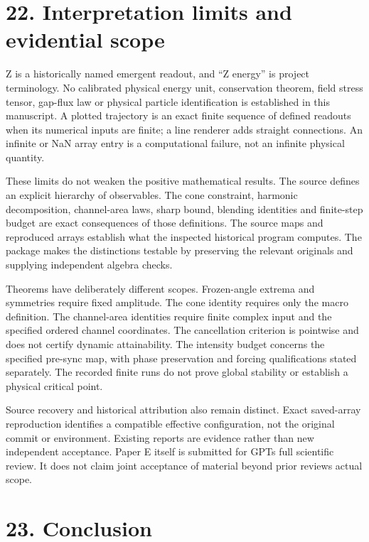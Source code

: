 \documentclass[
  11pt,
  a4paper,
]{article}
\begin{document}
\section{22. Interpretation limits and evidential scope}\label{interpretation-limits-and-evidential-scope}

Z is a historically named emergent readout, and ``Z energy'' is project terminology. No calibrated physical energy unit, conservation theorem, field stress tensor, gap-flux law or physical particle identification is established in this manuscript. A plotted trajectory is an exact finite sequence of defined readouts when its numerical inputs are finite; a line renderer adds straight connections. An infinite or NaN array entry is a computational failure, not an infinite physical quantity.

These limits do not weaken the positive mathematical results. The source defines an explicit hierarchy of observables. The cone constraint, harmonic decomposition, channel-area laws, sharp bound, blending identities and finite-step budget are exact consequences of those definitions. The source maps and reproduced arrays establish what the inspected historical program computes. The package makes the distinctions testable by preserving the relevant originals and supplying independent algebra checks.

Theorems have deliberately different scopes. Frozen-angle extrema and symmetries require fixed amplitude. The cone identity requires only the macro definition. The channel-area identities require finite complex input and the specified ordered channel coordinates. The cancellation criterion is pointwise and does not certify dynamic attainability. The intensity budget concerns the specified pre-sync map, with phase preservation and forcing qualifications stated separately. The recorded finite runs do not prove global stability or establish a physical critical point.

Source recovery and historical attribution also remain distinct. Exact saved-array reproduction identifies a compatible effective configuration, not the original commit or environment. Existing reports are evidence rather than new independent acceptance. Paper E itself is submitted for GPT\textquotesingle s full scientific review. It does not claim joint acceptance of material beyond prior reviews\textquotesingle{} actual scope.

\section{23. Conclusion}\label{conclusion}
\end{document}
